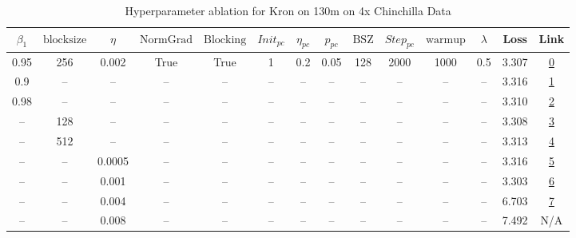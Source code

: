 \begin{table}[H]
\centering
\caption{Hyperparameter ablation for Kron on 130m on 4x Chinchilla Data}
\label{tab:ablation_kron_130m_4}
\begin{tabular}{cccccccccccccc}
\toprule
$\beta_1$ & $\mathrm{block size}$ & $\eta$ & $\mathrm{NormGrad}$ & $\mathrm{Blocking}$ & $Init_{pc}$ & $\eta_{pc}$ & $p_{pc}$ & $\mathrm{BSZ}$ & $Step_{pc}$ & $\mathrm{warmup}$ & $\lambda$ & Loss & Link \\
\midrule
0.95 & 256 & 0.002 & True & True & 1 & 0.2 & 0.05 & 128 & 2000 & 1000 & 0.5 & 3.307 & \href{https://wandb.ai/stanford-mercury/optimizer-scaling/runs/sweep-130m-10B-kronm1a1c3blr0.002-wd0.5-b10.95-plr0.2-pis1-gn1-n-b8692a}{0} \\
\midrule
0.9 & -- & -- & -- & -- & -- & -- & -- & -- & -- & -- & -- & 3.316 & \href{https://wandb.ai/stanford-mercury/optimizer-scaling/runs/sweep-130m-10B-kronc8cdf3lr0.002-wd0.5-b10.9-plr0.2-pis1-gn1-nor-e40586}{1} \\
0.98 & -- & -- & -- & -- & -- & -- & -- & -- & -- & -- & -- & 3.310 & \href{https://wandb.ai/stanford-mercury/optimizer-scaling/runs/sweep-130m-10B-kron05da28lr0.002-wd0.5-b10.98-plr0.2-pis1-gn1-no-be2fbc}{2} \\
-- & 128 & -- & -- & -- & -- & -- & -- & -- & -- & -- & -- & 3.308 & \href{https://wandb.ai/stanford-mercury/optimizer-scaling/runs/sweep-130m-10B-kron494d83lr0.002-wd0.5-b10.95-plr0.2-pis1-gn1-no-134f26}{3} \\
-- & 512 & -- & -- & -- & -- & -- & -- & -- & -- & -- & -- & 3.313 & \href{https://wandb.ai/stanford-mercury/optimizer-scaling/runs/sweep-130m-10B-krond4b6e6lr0.002-wd0.5-b10.95-plr0.2-pis1-gn1-no-439652}{4} \\
-- & -- & 0.0005 & -- & -- & -- & -- & -- & -- & -- & -- & -- & 3.316 & \href{https://wandb.ai/stanford-mercury/optimizer-scaling/runs/sweep-130m-10B-kron53973dlr0.0005-wd0.5-b10.95-plr0.2-pis1-gn1-n-7bcfe7}{5} \\
-- & -- & 0.001 & -- & -- & -- & -- & -- & -- & -- & -- & -- & 3.303 & \href{https://wandb.ai/stanford-mercury/optimizer-scaling/runs/sweep-130m-10B-kron2f3c38lr0.001-wd0.5-b10.95-plr0.2-pis1-gn1-no-a0a910}{6} \\
-- & -- & 0.004 & -- & -- & -- & -- & -- & -- & -- & -- & -- & 6.703 & \href{https://wandb.ai/stanford-mercury/optimizer-scaling/runs/sweep-130m-10B-kron053fe8lr0.004-wd0.5-b10.95-plr0.2-pis1-gn1-no-611f99}{7} \\
-- & -- & 0.008 & -- & -- & -- & -- & -- & -- & -- & -- & -- & 7.492 & N/A \\

\end{tabular}
\end{table}
